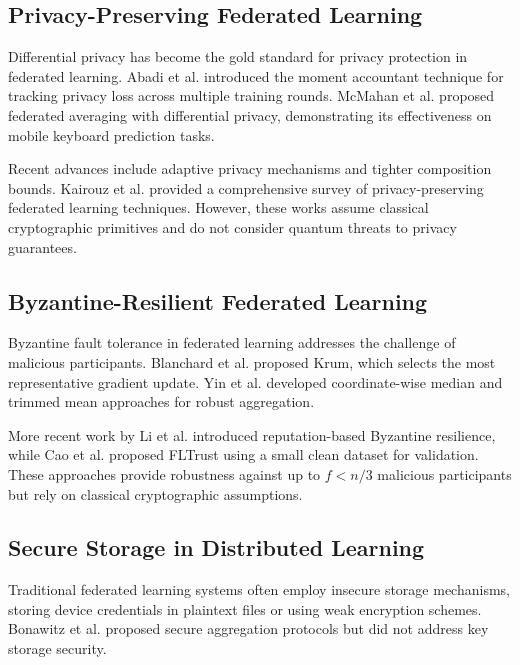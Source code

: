 \documentclass[conference]{IEEEtran}
\begin{document}
\subsection{Privacy-Preserving Federated Learning}

Differential privacy has become the gold standard for privacy protection in federated learning. Abadi et al. \cite{abadi2016deep} introduced the moment accountant technique for tracking privacy loss across multiple training rounds. McMahan et al. \cite{mcmahan2018learning} proposed federated averaging with differential privacy, demonstrating its effectiveness on mobile keyboard prediction tasks.

Recent advances include adaptive privacy mechanisms and tighter composition bounds. Kairouz et al. \cite{kairouz2021advances} provided a comprehensive survey of privacy-preserving federated learning techniques. However, these works assume classical cryptographic primitives and do not consider quantum threats to privacy guarantees.

\subsection{Byzantine-Resilient Federated Learning}

Byzantine fault tolerance in federated learning addresses the challenge of malicious participants. Blanchard et al. \cite{blanchard2017machine} proposed Krum, which selects the most representative gradient update. Yin et al. \cite{yin2018byzantine} developed coordinate-wise median and trimmed mean approaches for robust aggregation.

More recent work by Li et al. \cite{li2020byzantine} introduced reputation-based Byzantine resilience, while Cao et al. \cite{cao2021fltrust} proposed FLTrust using a small clean dataset for validation. These approaches provide robustness against up to $f < n/3$ malicious participants but rely on classical cryptographic assumptions.

\subsection{Secure Storage in Distributed Learning}

Traditional federated learning systems often employ insecure storage mechanisms, storing device credentials in plaintext files or using weak encryption schemes. Bonawitz et al. \cite{bonawitz2017practical} proposed secure aggregation protocols but did not address key storage security. 
\end{document}
